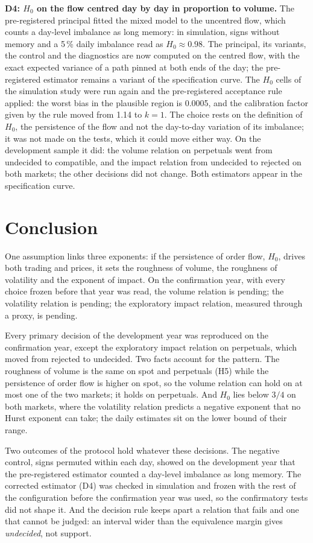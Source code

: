 \documentclass[11pt]{article}
\newcommand{\Hz}{H_0}
\providecommand{\resultHOneBoth}{pending}
\providecommand{\resultHTwoBoth}{pending}
\providecommand{\resultHThreeBoth}{pending}
\providecommand{\sdInflation}{1}
\begin{document}
\textbf{D4: $\Hz$ on the flow centred day by day in proportion to volume.} The
pre-registered principal fitted the mixed model to the uncentred flow, which counts a
day-level imbalance as long memory: in simulation, signs without memory and a 5\,\% daily
imbalance read as $\Hz\approx0.98$. The principal, its variants, the control and the
diagnostics are now computed on the centred flow, with the exact expected variance of a
path pinned at both ends of the day; the pre-registered estimator remains a variant of the
specification curve. The $\Hz$ cells of the simulation study were run again and the
pre-registered acceptance rule applied: the worst bias in the plausible region is 0.0005,
and the calibration factor given by the rule moved from 1.14 to $k=\sdInflation$. The
choice rests on the definition of $\Hz$, the persistence of the flow and not the
day-to-day variation of its imbalance; it was not made on the tests, which it could move
either way. On the development sample it did: the volume relation on perpetuals went
from undecided to compatible, and the impact relation from undecided to rejected on both
markets; the other decisions did not change. Both estimators appear in the specification
curve.

\section{Conclusion}
One assumption links three exponents: if the persistence of order flow, $\Hz$, drives both
trading and prices, it sets the roughness of volume, the roughness of volatility and the
exponent of impact. On the confirmation year, with every choice frozen before that year
was read, the volume relation is \resultHOneBoth; the volatility relation is
\resultHTwoBoth; the exploratory impact relation, measured through a proxy, is
\resultHThreeBoth.

Every primary decision of the development year was reproduced on the confirmation year,
except the exploratory impact relation on perpetuals, which moved from rejected to
undecided. Two facts account for the pattern. The roughness of volume is the same on spot
and perpetuals (H5) while the persistence of order flow is higher on spot, so the volume
relation can hold on at most one of the two markets; it holds on perpetuals. And $\Hz$
lies below $3/4$ on both markets, where the volatility relation predicts a negative
exponent that no Hurst exponent can take; the daily estimates sit on the lower bound of
their range.

Two outcomes of the protocol hold whatever these decisions. The negative control, signs
permuted within each day, showed on the development year that the pre-registered
estimator counted a day-level imbalance as long memory. The corrected estimator (D4) was
checked in simulation and frozen with the rest of the configuration before the
confirmation year was used, so the confirmatory tests did not shape it. And the decision
rule keeps apart a relation that fails and one that cannot be judged: an interval wider
than the equivalence margin gives \emph{undecided}, not support.
\end{document}
